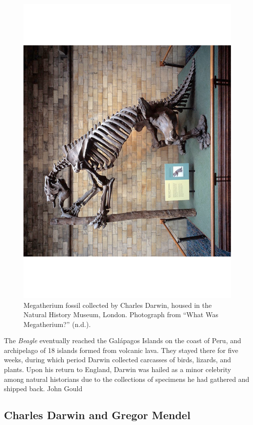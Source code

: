 \documentclass[
]{book}
\begin{document}
\begin{figure}
\includegraphics[width=1\linewidth]{figs/introduction/megatherium} \caption{Megatherium fossil collected by Charles Darwin, housed in the Natural History Museum, London. Photograph from {``What Was {Megatherium}?''} (n.d.).}\label{fig:megatherium}
\end{figure}

The \emph{Beagle} eventually reached the Galápagos Islands on the coast of Peru, and archipelago of 18 islands formed from volcanic lava. They stayed there for five weeks, during which period Darwin collected carcasses of birds, lizards, and plants. Upon his return to England, Darwin was hailed as a minor celebrity among natural historians due to the collections of specimens he had gathered and shipped back. John Gould

\hypertarget{charles-darwin-and-gregor-mendel}{%
\subsection{Charles Darwin and Gregor Mendel}\label{charles-darwin-and-gregor-mendel}}
\end{document}
